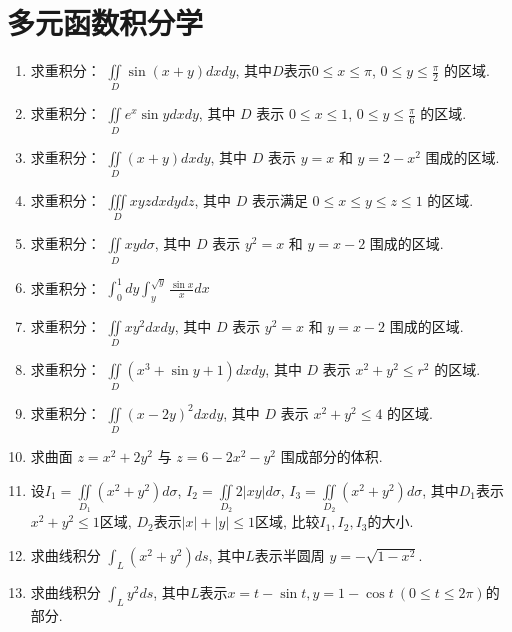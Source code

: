 \section{多元函数积分学}
\begin{enumerate}
	\item 求重积分： $\iint\limits_D \sin(x+y)dxdy$, 其中$D$表示$0 \leq x \leq \pi$, $0 \leq y \leq \frac{\pi}{2}$ 的区域.

	\item 求重积分： $\iint\limits_D e^x \sin y dxdy$, 其中 $D$ 表示 $0 \leq x \leq 1$, $0 \leq y \leq \frac{\pi}{6}$ 的区域.	
	
	\item 求重积分： $\iint\limits_D (x+y)dxdy$, 其中 $D$ 表示 $y=x$ 和 $y=2-x^2$ 围成的区域.
	
	\item 求重积分： $\iiint\limits_D xyzdxdydz$, 其中 $D$ 表示满足 $0 \leq x \leq y \leq z \leq 1$ 的区域.
	
	\item 求重积分： $\iint\limits_D xy d\sigma$, 其中 $D$ 表示 $y^2 = x$ 和 $y=x-2$ 围成的区域.
	
	\item 求重积分： $\int_0^1 dy \int_y^{\sqrt{y}} \frac{\sin x}{x} dx$

	\item 求重积分： $\iint\limits_D xy^2 dxdy$, 其中 $D$ 表示 $y^2 = x$ 和 $y=x-2$ 围成的区域.
	
	\item 求重积分： $\iint\limits_D (x^3+\sin y+1)dxdy$, 其中 $D$ 表示 $x^2 + y^2 \leq r^2$ 的区域.
	
	\item 求重积分： $\iint\limits_D (x-2y)^2 dxdy$, 其中 $D$ 表示 $x^2 + y^2 \leq 4$ 的区域.
	
	\item 求曲面 $z = x^2 + 2y^2$ 与 $z = 6 - 2x^2 - y^2$ 围成部分的体积.
	
	
	\item 设$I_1=\iint\limits_{D_1} (x^2+y^2)d\sigma$, $I_2=\iint\limits_{D_2} 2|xy|d\sigma$, $I_3=\iint\limits_{D_2} (x^2+y^2)d\sigma$, 其中$D_1$表示$x^2+y^2 \leq 1$区域, $D_2$表示$|x|+|y| \leq 1$区域, 比较$I_1, I_2, I_3$的大小.
	
	\item 求曲线积分 $\int_L (x^2+y^2) ds$, 其中$L$表示半圆周 $y = -\sqrt{1-x^2}$.
	
	\item 求曲线积分 $\int_L y^2 ds$, 其中$L$表示$x = t - \sin t, y = 1 - \cos t \ (0 \leq t \leq 2\pi)$的部分.
	

\end{enumerate}
